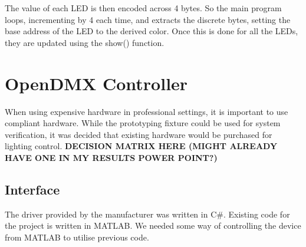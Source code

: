 The value of each LED is then encoded across 4 bytes.
So the main program loops, incrementing by 4 each time,
and extracts the discrete bytes, setting the base address of the LED to the derived color.
Once this is done for all the LEDs, they are updated using the show() function.

\section{OpenDMX Controller}
When using expensive hardware in professional settings, it is important to use compliant hardware.
While the prototyping fixture could be used for system verification,
it was decided that existing hardware would be purchased for lighting control.
\textbf{DECISION MATRIX HERE (MIGHT ALREADY HAVE ONE IN MY RESULTS POWER POINT?)}

\subsection{Interface}
The driver provided by the manufacturer was written in C\#.
Existing code for the project is written in MATLAB.
We needed some way of controlling the device from MATLAB to utilise previous code.

